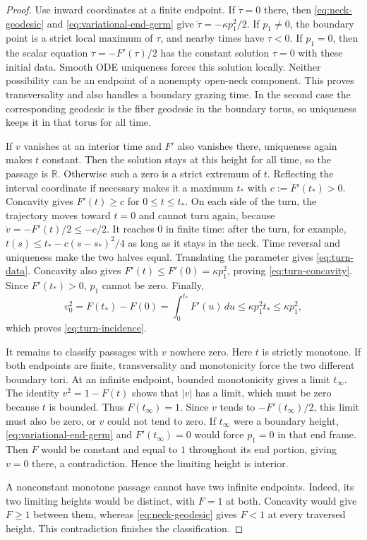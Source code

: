 \begin{proof}
Use inward coordinates at a finite endpoint.  If $\dot\tau=0$ there,
then \eqref{eq:neck-geodesic} and \eqref{eq:variational-end-germ} give
$\ddot\tau=-\kappa p_1^2/2$.  If $p_1\ne0$, the boundary point is a
strict local maximum of $\tau$, and nearby times have $\tau<0$.
If $p_1=0$, then the scalar equation
$\ddot\tau=-F'(\tau)/2$ has the constant solution $\tau=0$ with these
initial data.  Smooth ODE uniqueness forces this solution locally.
Neither possibility can be an endpoint of a nonempty open-neck
component.  This proves transversality and also handles a boundary
grazing time.  In the second case the corresponding geodesic is the
fiber geodesic in the boundary torus, so uniqueness keeps it in that
torus for all time.

If $v$ vanishes at an interior time and $F'$ also vanishes there,
uniqueness again makes $t$ constant.  Then the solution stays at this
height for all time, so the passage is $\mathbb R$.
Otherwise such a zero is a strict extremum of $t$.  Reflecting the
interval coordinate if necessary makes it a maximum $t_*$ with
$c:=F'(t_*)>0$.  Concavity gives $F'(t)\ge c$ for $0\le t\le t_*$.
On each side of the turn, the trajectory moves toward $t=0$ and cannot
turn again, because $\dot v=-F'(t)/2\le-c/2$.
It reaches $0$ in finite time: after the turn, for example,
$t(s)\le t_* -c(s-s_*)^2/4$ as long as it stays in the neck.
Time reversal and uniqueness make the two halves equal.  Translating
the parameter gives \eqref{eq:turn-data}.  Concavity also gives
$F'(t)\le F'(0)=\kappa p_1^2$, proving
\eqref{eq:turn-concavity}.  Since $F'(t_*)>0$, $p_1$ cannot be zero.
Finally,
\[
 v_0^2=F(t_*)-F(0)=\int_0^{t_*}F'(u)\,du
          \le\kappa p_1^2t_*\le\kappa p_1^2,
\]
which proves \eqref{eq:turn-incidence}.

It remains to classify passages with $v$ nowhere zero.  Here $t$ is
strictly monotone.  If both endpoints are finite, transversality and
monotonicity force the two different boundary tori.  At an infinite
endpoint, bounded monotonicity gives a limit $t_\infty$.
The identity $v^2=1-F(t)$ shows that $|v|$ has a limit, which must be
zero because $t$ is bounded.  Thus $F(t_\infty)=1$.
Since $\dot v$ tends to $-F'(t_\infty)/2$, this limit must also be zero,
or $v$ could not tend to zero.  If $t_\infty$ were a boundary height,
\eqref{eq:variational-end-germ} and $F'(t_\infty)=0$ would force
$p_1=0$ in that end frame.  Then $F$ would be constant and equal to $1$
throughout its end portion, giving $v=0$ there, a contradiction.
Hence the limiting height is interior.

A nonconstant monotone passage cannot have two infinite endpoints.
Indeed, its two limiting heights would be distinct, with $F=1$ at
both.  Concavity would give $F\ge1$ between them, whereas
\eqref{eq:neck-geodesic} gives $F<1$ at every traversed height.
This contradiction finishes the classification.
\end{proof}

